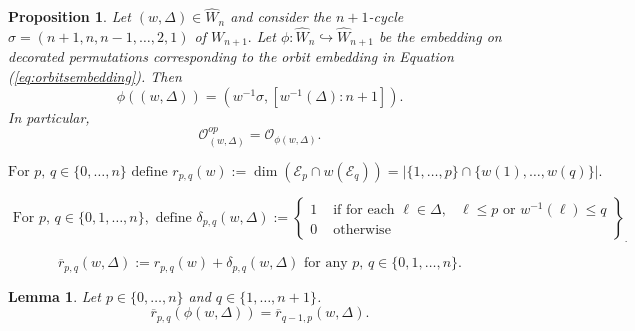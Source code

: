 \documentclass[10pt,a4paper]{amsart}
\newtheorem{prop}{Proposition}
\newtheorem{lem}{Lemma}
\newcommand{\cW}{{ W}}
\begin{document}
\begin{prop}\label{p:marked}
Let $(w,\Delta)\in\widehat{\cW}_{n}$ and consider the $n+1$-cycle $\sigma=(n+1, n, n-1,\dots, 2, 1)$ of $\cW_{n+1}.$    Let $\phi: \widehat{\cW}_{n}\hookrightarrow \widehat{\cW}_{n+1}$ be the embedding on decorated permutations corresponding to the orbit embedding in Equation (\ref{eq:orbitsembedding}).  Then 
\begin{equation}\label{eq:permutation}
\phi((w,\Delta))=(w^{-1}\sigma, [w^{-1}(\Delta):n+1]).
\end{equation}
In particular, 
\begin{equation}\label{eq:opdecorated}
\mathcal{O}_{(w,\Delta)}^{op}=\mathcal{O}_{\phi(w,\Delta)}.
\end{equation}
\end{prop}

\begin{equation}\label{eq:firststat}
\mbox{For } p,\, q\in\{0,\dots, n\}\mbox{ define } r_{p,q}(w):=\dim(\mathcal{E}_{p}\cap w(\mathcal{E}_{q}))=|\{1,\dots, p\}\cap \{w(1),\dots, w(q)\}|.
\end{equation}    

\begin{equation}\label{eq:littledelta}
\mbox{ For } p,\,q\in\{0,1,\dots, n\}, \mbox{ define } \delta_{p, q} (w,\Delta):=\left\{\begin{array}{ccc} 1 & \mbox { if for each } \ell\in\Delta, & \ell\leq p \mbox{ or } w^{-1}(\ell)\leq q \\
0 &\mbox{ otherwise } & \end{array}\right\}_{.}
\end{equation}

\begin{equation}\label{eq:secondstat}
\overline{r}_{p,q}(w,\Delta):=r_{p,q}(w)+\delta_{p,q}(w,\Delta)\mbox{ for any } p,\, q\in\{0,1,\dots, n\}.
\end{equation}

\begin{lem}\label{l:compare}
Let $p\in\{0,\dots, n\}$ and $q\in\{1,\dots, n+1\}$.  %
\begin{equation}\label{eq:shift}
\overline{r}_{p,q}(\phi(w,\Delta))=\overline{r}_{q-1,p} (w,\Delta).
\end{equation}
\end{lem}
\end{document}
